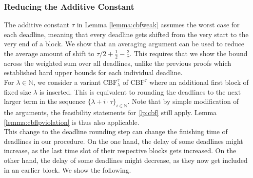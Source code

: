 \documentclass[11pt]{article}
\begin{document}
\subsubsection*{Reducing the Additive Constant}
The additive constant $\tau$ in Lemma \ref{lemma:cbfweak} assumes the worst case for each deadline, meaning that every deadline gets shifted from the very start to the very end of a block. We show that an averaging argument can be used to reduce the average amount of shift to $\tau/2 + \frac{1}{2} - \frac{2}{\tau}$. This requires that we show the bound across the weighted sum over all deadlines, unlike the previous proofs which established hard upper bounds for each individual deadline.\\

For $\lambda \in \mathbb{N}$, we consider a variant $\mathrm{CBF}^\tau_\lambda$ of $\mathrm{CBF}^\tau$ where an additional first block of fixed size $\lambda$ is inserted. This is equivalent to rounding the deadlines to the next larger term in the sequence $\{\lambda+i\cdot\tau\}_{i \in \mathbb{N}}$. Note that by simple modification of the arguments, the feasibility statements for \ref{lp:cbf} still apply. Lemma \ref{lemma:cbflpviolation} is thus also applicable.\\

This change to the deadline rounding step can change the finishing time of deadlines in our procedure. On the one hand, the delay of some deadlines might increase, as the last time slot of their respective blocks gets increased. On the other hand, the delay of some deadlines might decrease, as they now get included in an earlier block. We show the following.
\end{document}
